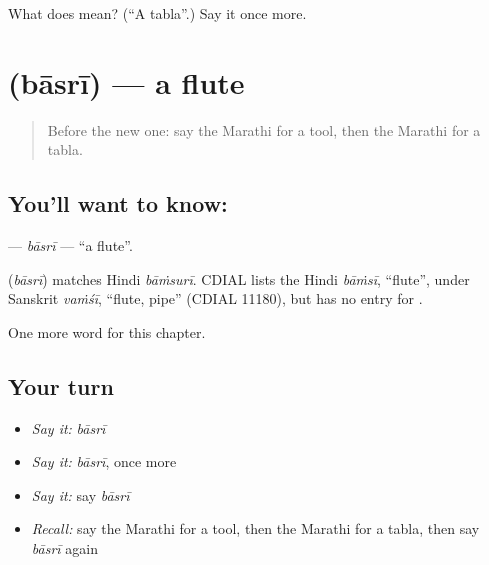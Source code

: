 \begin{tcolorbox}[breakable,colback=teal!4,colframe=teal!35!black,title={Before you move on}]
What does  mean? (\textquotedblleft{}A tabla\textquotedblright{}.) Say it once more.
\end{tcolorbox}
\section[\texorpdfstring{\mr{बासरी} (bāsrī)}{बासरी (bāsrī)}]{ (bāsrī) — a flute}

\label{lesson:MR-C268-basri}



\begin{quote}
Before the new one: say the Marathi for a tool, then the Marathi for a tabla.
\end{quote}

\subsection*{You'll want to know: }
\textbf{} — \emph{bāsrī} — \textquotedblleft{}a flute\textquotedblright{}.

\begin{cousinweb}
\textbf{} (\emph{bāsrī}) matches Hindi \emph{bāṁsurī}. CDIAL lists the Hindi \emph{bāṁsī}, \textquotedblleft{}flute\textquotedblright{}, under Sanskrit \emph{vaṁśī}, \textquotedblleft{}flute, pipe\textquotedblright{} (CDIAL 11180), but has no entry for \textbf{}.
\end{cousinweb}

\begin{grammarlens}[title={What you've built}]
One more word for this chapter.
\end{grammarlens}

\subsection*{Your turn}
\begin{itemize}
\raggedright
  \item \emph{Say it:} \emph{bāsrī}
  \item \emph{Say it:} \emph{bāsrī}, once more
  \item \emph{Say it:} say \emph{bāsrī}
  \item \emph{Recall:} say the Marathi for a tool, then the Marathi for a tabla, then say \emph{bāsrī} again
\end{itemize}

